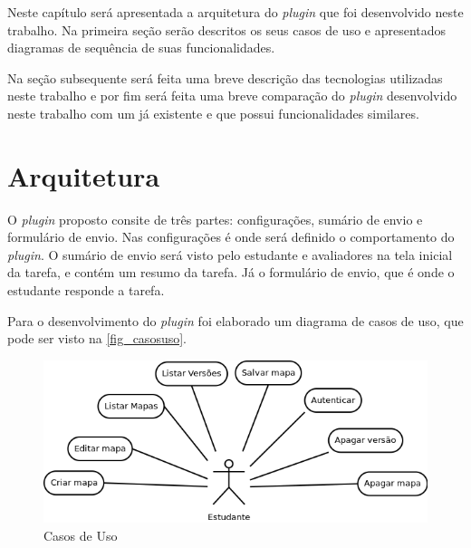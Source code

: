 \documentclass[
	12pt,				%
	openright,			%
	oneside,			%
	a4paper,			%
	english,			%
	french,				%
	spanish,			%
	brazil				%
	]{abntex2}
\begin{document}

Neste capítulo será apresentada a arquitetura do \textit{plugin} que foi desenvolvido neste trabalho. Na primeira seção serão descritos os seus casos de uso e apresentados diagramas de sequência de suas funcionalidades.

Na seção subsequente será feita uma breve descrição das tecnologias utilizadas neste trabalho e por fim será feita uma breve comparação do \textit{plugin} desenvolvido neste trabalho com um já existente e que possui funcionalidades similares.

\section{Arquitetura}

O \textit{plugin} proposto consite de três partes: configurações, sumário de envio e formulário de envio. Nas configurações é onde será definido o comportamento do \textit{plugin}. O sumário de envio será visto pelo estudante e avaliadores na tela inicial da tarefa, e contém um resumo da tarefa. Já o formulário de envio, que é onde o estudante responde a tarefa.

%

Para o desenvolvimento do \textit{plugin} foi elaborado um diagrama de casos de uso, que pode ser visto na \autoref{fig_casosuso}. 

\begin{figure}[!h]
	\caption{\label{fig_casosuso} Casos de Uso}
	\begin{center}
		\includegraphics[scale=0.7]{casosuso.png}
	\end{center}
\end{figure} 
\end{document}
